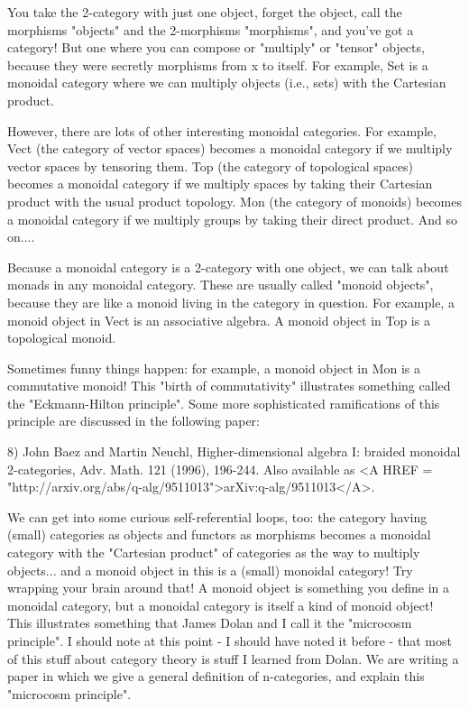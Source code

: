 You take the 2-category with just one object, forget the object, call
the morphisms "objects" and the 2-morphisms
"morphisms", and you've got a category!  But one where you can
compose or "multiply" or "tensor" objects, because
they were secretly morphisms from x to itself.  For example, Set is a
monoidal category where we can multiply objects (i.e., sets) with the
Cartesian product.

However, there are lots of other interesting monoidal categories.  For
example, Vect (the category of vector spaces) becomes a monoidal
category if we multiply vector spaces by tensoring them.  Top (the
category of topological spaces) becomes a monoidal category if we
multiply spaces by taking their Cartesian product with the usual product
topology.    Mon (the category of monoids) becomes a monoidal category if
we multiply groups by taking their direct product.   And so on....

Because a monoidal category is a 2-category with one object, we can talk
about monads in any monoidal category.  These are usually called 
"monoid objects", because they are like a monoid living in the category
in question.  For example, a monoid object in Vect is an associative
algebra.  A monoid object in Top is a topological monoid.   

Sometimes funny things happen: for example, a monoid object in Mon is a
commutative monoid!  This "birth of commutativity" illustrates something
called the "Eckmann-Hilton principle".  Some more sophisticated
ramifications of this principle are discussed in the following paper:

8) John Baez and Martin Neuchl, Higher-dimensional algebra I: braided
monoidal 2-categories, Adv. Math. 121 (1996), 196-244.  Also
available as 
<A HREF = "http://arxiv.org/abs/q-alg/9511013">arXiv:q-alg/9511013</A>. 

We can get into some curious self-referential loops, too: the category
having (small) categories as objects and functors as morphisms
becomes a monoidal category with the "Cartesian product" of categories as
the way to multiply objects... and a monoid object in this is a (small)
monoidal category!  Try wrapping your brain around that!  A monoid
object is something you define in a monoidal category, but a monoidal
category is itself a kind of monoid object!  This illustrates something
that James Dolan and I call it the "microcosm principle".  I should note
at this point - I should have noted it before - that most of this
stuff about category theory is stuff I learned from Dolan.  We are
writing a paper in which we give a general definition of n-categories,
and explain this "microcosm principle".


